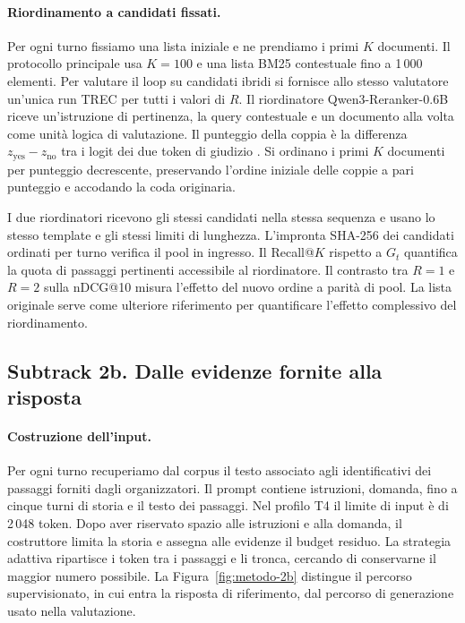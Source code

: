 \paragraph{Riordinamento a candidati fissati.}
Per ogni turno fissiamo una lista iniziale e ne prendiamo i primi $K$ documenti. Il protocollo principale usa $K=100$ e una lista BM25 contestuale fino a 1\,000 elementi. Per valutare il loop su candidati ibridi si fornisce allo stesso valutatore un'unica run TREC per tutti i valori di $R$. Il riordinatore Qwen3-Reranker-0.6B riceve un'istruzione di pertinenza, la query contestuale e un documento alla volta come unità logica di valutazione. Il punteggio della coppia è la differenza $z_{\mathrm{yes}}-z_{\mathrm{no}}$ tra i logit dei due token di giudizio \cite{qwen}. Si ordinano i primi $K$ documenti per punteggio decrescente, preservando l'ordine iniziale delle coppie a pari punteggio e accodando la coda originaria.

I due riordinatori ricevono gli stessi candidati nella stessa sequenza e usano lo stesso template e gli stessi limiti di lunghezza. L'impronta SHA-256 dei candidati ordinati per turno verifica il pool in ingresso. Il Recall@$K$ rispetto a $G_t$ quantifica la quota di passaggi pertinenti accessibile al riordinatore. Il contrasto tra $R=1$ e $R=2$ sulla nDCG@10 misura l'effetto del nuovo ordine a parità di pool. La lista originale serve come ulteriore riferimento per quantificare l'effetto complessivo del riordinamento.

\subsection{Subtrack 2b. Dalle evidenze fornite alla risposta}
\paragraph{Costruzione dell'input.}
Per ogni turno recuperiamo dal corpus il testo associato agli identificativi dei passaggi forniti dagli organizzatori. Il prompt contiene istruzioni, domanda, fino a cinque turni di storia e il testo dei passaggi. Nel profilo T4 il limite di input è di 2\,048 token. Dopo aver riservato spazio alle istruzioni e alla domanda, il costruttore limita la storia e assegna alle evidenze il budget residuo. La strategia adattiva ripartisce i token tra i passaggi e li tronca, cercando di conservarne il maggior numero possibile. La Figura~\ref{fig:metodo-2b} distingue il percorso supervisionato, in cui entra la risposta di riferimento, dal percorso di generazione usato nella valutazione.

